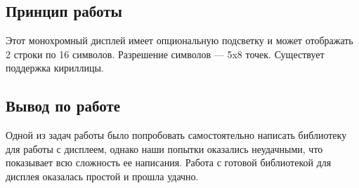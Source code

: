 \documentclass[12pt,a4paper]{scrartcl}
\begin{document}
\subsection{Принцип работы}
Этот монохромный дисплей имеет опциональную подсветку и может отображать 2 строки по 16 символов. Разрешение символов — 5x8 точек. Существует поддержка кириллицы.

\subsection{Вывод по работе}
Одной из задач работы было попробовать самостоятельно написать библиотеку для работы с дисплеем, однако наши попытки оказались неудачными, что показывает всю сложность ее написания. Работа с готовой библиотекой для дисплея оказалась простой и прошла удачно. 
\end{document}
